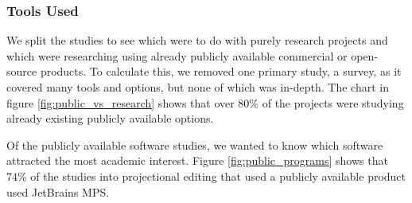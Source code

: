 \subsubsection{Tools Used}
We split the studies to see which were to do with purely research projects and which were researching using already publicly available commercial or open-source products.
To calculate this, we removed one primary study, a survey, as it covered many tools and options, but none of which was in-depth.
The chart in figure \ref{fig:public_vs_research} shows that over 80\% of the projects were studying already existing publicly available options.

Of the publicly available software studies, we wanted to know which software attracted the most academic interest.
Figure \ref{fig:public_programs} shows that 74\% of the studies into projectional editing that used a publicly available product used JetBrains MPS.

